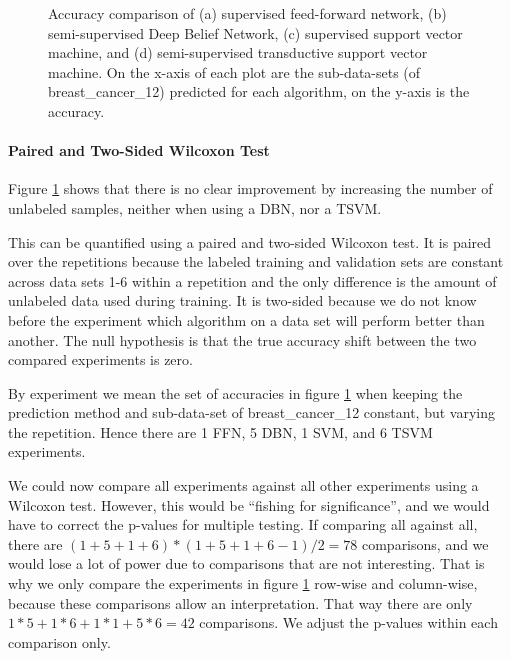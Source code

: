 \begin{figure}
\begin{centering}
\begin{tabular}{cc}
\end{tabular}
\par\end{centering}
\caption[Accuracy comparison of supervised feed-forward network, semi-supervised
Deep Belief Network, supervised support vector machine, and semi-supervised
transductive support vector machine.]{\label{fig:Accuracy-comparison-of-breast_cancer_12}Accuracy comparison
of (a) supervised feed-forward network, (b) semi-supervised Deep Belief
Network, (c) supervised support vector machine, and (d) semi-supervised
transductive support vector machine. On the x-axis of each plot are
the sub-data-sets (of breast\_cancer\_12) predicted for each algorithm,
on the y-axis is the accuracy.}
\end{figure}

\paragraph{Paired and Two-Sided Wilcoxon Test}

Figure \ref{fig:Accuracy-comparison-of-breast_cancer_12} shows that
there is no clear improvement by increasing the number of unlabeled
samples, neither when using a DBN, nor a TSVM.

This can be quantified using a paired and two-sided Wilcoxon test.
It is paired over the repetitions because the labeled training and
validation sets are constant across data sets 1-6 within a repetition
and the only difference is the amount of unlabeled data used during
training. It is two-sided because we do not know before the experiment
which algorithm on a data set will perform better than another. The
null hypothesis is that the true accuracy shift between the two compared
experiments is zero.

By experiment we mean the set of accuracies in figure \ref{fig:Accuracy-comparison-of-breast_cancer_12}
when keeping the prediction method and sub-data-set of breast\_cancer\_12
constant, but varying the repetition. Hence there are 1 FFN, 5 DBN,
1 SVM, and 6 TSVM experiments.

We could now compare all experiments against all other experiments
using a Wilcoxon test. However, this would be ``fishing for significance'',
and we would have to correct the p-values for multiple testing. If
comparing all against all, there are $(1+5+1+6)*(1+5+1+6-1)/2=78$
comparisons, and we would lose a lot of power due to comparisons that
are not interesting. That is why we only compare the experiments in
figure \ref{fig:Accuracy-comparison-of-breast_cancer_12} row-wise
and column-wise, because these comparisons allow an interpretation.
That way there are only $1*5+1*6+1*1+5*6=42$ comparisons. We adjust
the p-values within each comparison only.

